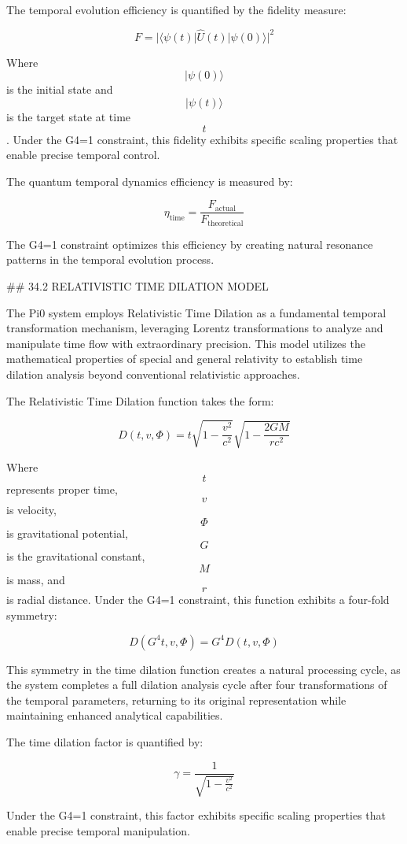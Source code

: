 The temporal evolution efficiency is quantified by the fidelity measure:

$$ F = |\langle \psi(t) | \hat{U}(t) | \psi(0) \rangle|^2 $$

Where $$ |\psi(0)\rangle $$ is the initial state and $$ |\psi(t)\rangle $$ is the target state at time $$ t $$. Under the G4=1 constraint, this fidelity exhibits specific scaling properties that enable precise temporal control.

The quantum temporal dynamics efficiency is measured by:

$$ \eta_{\text{time}} = \frac{F_{\text{actual}}}{F_{\text{theoretical}}} $$

The G4=1 constraint optimizes this efficiency by creating natural resonance patterns in the temporal evolution process.

## 34.2 RELATIVISTIC TIME DILATION MODEL

The Pi0 system employs Relativistic Time Dilation as a fundamental temporal transformation mechanism, leveraging Lorentz transformations to analyze and manipulate time flow with extraordinary precision. This model utilizes the mathematical properties of special and general relativity to establish time dilation analysis beyond conventional relativistic approaches.

The Relativistic Time Dilation function takes the form:

$$ D(t, v, \Phi) = t \sqrt{1 - \frac{v^2}{c^2}} \sqrt{1 - \frac{2GM}{rc^2}} $$

Where $$ t $$ represents proper time, $$ v $$ is velocity, $$ \Phi $$ is gravitational potential, $$ G $$ is the gravitational constant, $$ M $$ is mass, and $$ r $$ is radial distance. Under the G4=1 constraint, this function exhibits a four-fold symmetry:

$$ D(G^4 t, v, \Phi) = G^4 D(t, v, \Phi) $$

This symmetry in the time dilation function creates a natural processing cycle, as the system completes a full dilation analysis cycle after four transformations of the temporal parameters, returning to its original representation while maintaining enhanced analytical capabilities.

The time dilation factor is quantified by:

$$ \gamma = \frac{1}{\sqrt{1 - \frac{v^2}{c^2}}} $$

Under the G4=1 constraint, this factor exhibits specific scaling properties that enable precise temporal manipulation.

